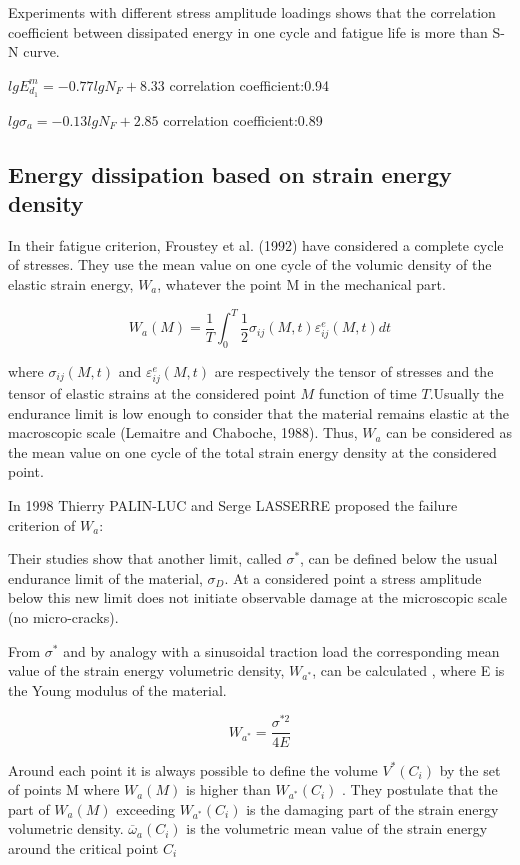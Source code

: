 \documentclass[3p,times,procedia,number]{elsarticle}
\begin{document}
Experiments with different stress amplitude loadings shows that the correlation coefficient between dissipated energy in one cycle and fatigue life is more than S-N curve.

$lgE_{d_1}^m=-0.77lgN_F+8.33$ correlation coefficient:0.94

$lg\sigma_a=-0.13lgN_F+2.85$ correlation coefficient:0.89


\subsection{Energy dissipation based on strain energy density}
In their fatigue criterion, Froustey et al. (1992)  have considered a complete cycle of
stresses. They use the mean value on one cycle of
the volumic density of the elastic strain energy, $W_a$, whatever the point
M in the mechanical part.

$$W_a(M)=\frac{1}{T}\int_{0}^{T}\frac{1}{2}\sigma_{ij}(M,t)\varepsilon_{ij}^e(M,t)dt$$

where $\sigma_{ij}(M,t)$ and $\varepsilon_{ij}^e(M,t)$ are respectively the tensor of stresses and the tensor of
elastic strains at the considered point $M$ function of time $T$.Usually the endurance limit
is low enough to consider that the material remains elastic at the macroscopic scale
(Lemaitre and Chaboche, 1988). Thus, $W_a$ can be considered as the mean value on one
cycle of the total strain energy density at the considered point.

In 1998 Thierry PALIN-LUC and Serge LASSERRE \cite{palin1998energy} proposed the failure criterion of $W_a$:

Their studies show that another limit, called $\sigma^*$, can be defined below
the usual endurance limit of the material, $\sigma_D$. At a considered point a stress amplitude
below this new limit does not initiate observable damage at the microscopic scale (no
micro-cracks).

From $\sigma^*$ and by analogy with a sinusoidal traction load the corresponding mean value
of the strain energy volumetric density, $W_{a^*}$, can be calculated , where E is the
Young modulus of the material.

$$W_{a^*}=\frac{\sigma^{*2}}{4E}$$

Around each point it is always possible to define
the volume $V^* (C_i)$ by the set of points M where $W_a (M)$ is higher than $W_{a^*} (C_i)$
. They postulate that the part of $W_a (M)$ exceeding $W_{a^*} (C_i)$ is the damaging part
of the strain energy volumetric density.  $\overline{\omega}_a(C_i)$ is
the volumetric mean value of the strain energy around the critical point $C_i$
\end{document}
